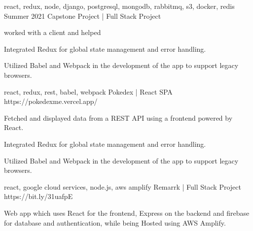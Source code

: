 


\begin{cventries}



  \cventry
    {react, redux, node, django, postgresql, mongodb, rabbitmq, s3, docker, redis } %
    {Summer 2021 Capstone Project | Full Stack Project}  %
    {} %
    {} 
    {
      \begin{cvitems} %
        \item {worked with a client and helped }
        \item {Integrated Redux for global state management and error handling.}
        \item {Utilized Babel and Webpack in the development of the app to support legacy browsers. }
      \end{cvitems}
    }

  \cventry
    {react, redux, rest, babel, webpack} %
    {Pokedex | React SPA}  %
    {https://pokedexme.vercel.app/} %
    {} 
    {
      \begin{cvitems} %
        \item {Fetched and displayed data from a REST API using a frontend powered by React.}
        \item {Integrated Redux for global state management and error handling.}
        \item {Utilized Babel and Webpack in the development of the app to support legacy browsers. }
      \end{cvitems}
    }

  \cventry
    {react, google cloud services, node.js, aws amplify} %
    {Remarrk | Full Stack Project}  %
    {https://bit.ly/31uafpE} %
    {} 
    {
      \begin{cvitems} %
        \item {Web app which uses React for the frontend, Express on the backend and firebase for database and authentication, while being Hosted using AWS Amplify.}
      \end{cvitems}
    }


\end{cventries}
